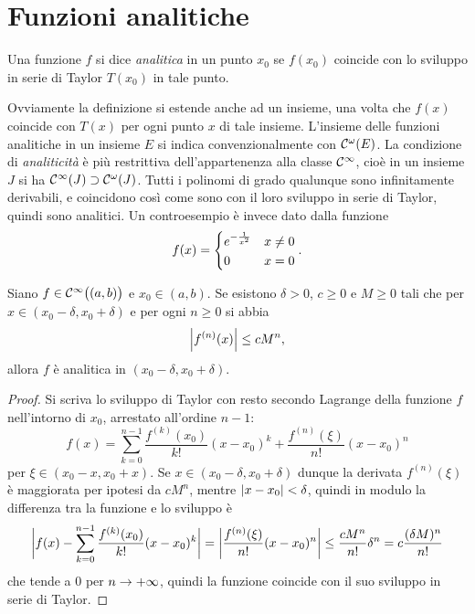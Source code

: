 \section{Funzioni analitiche}
\begin{definizione}
Una funzione $f$ si dice \emph{analitica} in un punto $x_0$ se $f(x_0)$ coincide con lo sviluppo in serie di Taylor $T(x_0)$ in tale punto.
\end{definizione}
Ovviamente la definizione si estende anche ad un insieme, una volta che $f(x)$ coincide con $T(x)$ per ogni punto $x$ di tale insieme.
L'insieme delle funzioni analitiche in un insieme $E$ si indica convenzionalmente con $\mathcal{C}^{{\omega}}(E)$. La condizione di \emph{analiticità} è più restrittiva dell'appartenenza alla classe $\mathcal{C}^{{\infty}}$, cioè in un insieme $J$ si ha $\mathcal{C}^{{\infty}}(J)\supset\mathcal{C}^{{\omega}}(J)$.
Tutti i polinomi di grado qualunque sono infinitamente derivabili, e coincidono così come sono con il loro sviluppo in serie di Taylor, quindi sono analitici. Un controesempio è invece dato dalla funzione
\[
f(x)=\begin{dcases}e^{-\frac1{x^2}}&x\neq 0\\0&x=0\end{dcases}.
\]

\begin{teorema}
Siano $f\in\mathcal{C}^{{\infty}}\big((a,b)\big)$ e $x_0\in(a,b)$. Se esistono $\delta>0$, $c\geq 0$ e $M\geq 0$ tali che per $x\in(x_0-\delta,x_0+\delta)$ e per ogni $n\geq 0$ si abbia
\[
\left|{f^{(n)}(x)}\right|\leq cM^n,
\]
allora $f$ è analitica in $(x_0-\delta,x_0+\delta)$.
\end{teorema}
\begin{proof}
Si scriva lo sviluppo di Taylor con resto secondo Lagrange della funzione $f$ nell'intorno di $x_0$, arrestato all'ordine $n-1$:
\[
f(x)=\sum_{k=0}^{n-1}\frac{f^{(k)}(x_0)}{k!}(x-x_0)^k+\frac{f^{(n)}(\xi)}{n!}(x-x_0)^n
\]
per $\xi\in(x_0-x,x_0+x)$. Se $x\in(x_0-\delta,x_0+\delta)$ dunque la derivata $f^{(n)}(\xi)$ è maggiorata per ipotesi da $cM^n$, mentre $\left|{x-x_0}\right|<\delta$, quindi in modulo la differenza tra la funzione e lo sviluppo è
\[
\bigg|f(x)-\sum_{k=0}^{n-1}\frac{f^{(k)}(x_0)}{k!}(x-x_0)^k\bigg|=\left|{\frac{f^{(n)}(\xi)}{n!}(x-x_0)^n}\right|\leq\frac{cM^n}{n!}\delta^n=c\frac{(\delta M)^n}{n!}
\]
che tende a 0 per $n\to+\infty$, quindi la funzione coincide con il suo sviluppo in serie di Taylor.
\end{proof}
